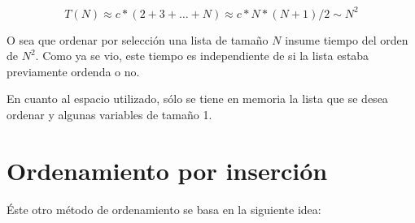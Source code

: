 \begin{equation}
T(N) \approx c * (2 + 3 + \ldots + N) \approx c * N * (N+1)/2 \sim N^2
\end{equation}

O sea que ordenar por selección una lista de tamaño $N$ insume tiempo del
orden de $N^2$.  Como ya se vio, este tiempo es independiente de si la
lista estaba previamente ordenda o no.

En cuanto al espacio utilizado, sólo se tiene en memoria la
lista que se desea ordenar y algunas variables de tamaño 1.

\section{Ordenamiento por inserción}

Éste otro método de ordenamiento se basa en la siguiente idea:


